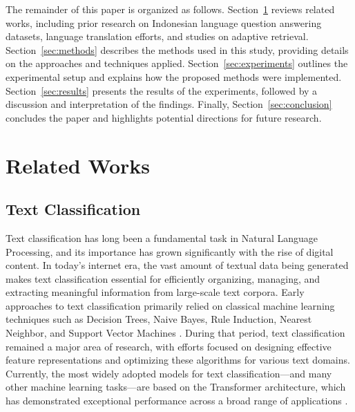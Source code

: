 \documentclass[times]{iapress}
\begin{document}
The remainder of this paper is organized as follows. Section~\ref{sec:related} reviews related works, including prior research on Indonesian language question answering datasets, language translation efforts, and studies on adaptive retrieval. Section~\ref{sec:methods} describes the methods used in this study, providing details on the approaches and techniques applied. Section~\ref{sec:experiments} outlines the experimental setup and explains how the proposed methods were implemented. Section~\ref{sec:results} presents the results of the experiments, followed by a discussion and interpretation of the findings. Finally, Section~\ref{sec:conclusion} concludes the paper and highlights potential directions for future research.


\section{Related Works}
\label{sec:related}

\subsection{Text Classification}
Text classification has long been a fundamental task in Natural Language Processing, and its importance has grown significantly with the rise of digital content. In today’s internet era, the vast amount of textual data being generated makes text classification essential for efficiently organizing, managing, and extracting meaningful information from large-scale text corpora. Early approaches to text classification primarily relied on classical machine learning techniques such as Decision Trees, Naive Bayes, Rule Induction, Nearest Neighbor, and Support Vector Machines \cite{classic_tc}. During that period, text classification remained a major area of research, with efforts focused on designing effective feature representations and optimizing these algorithms for various text domains. Currently, the most widely adopted models for text classification—and many other machine learning tasks—are based on the Transformer architecture, which has demonstrated exceptional performance across a broad range of applications \cite{transformer}. 
\end{document}
